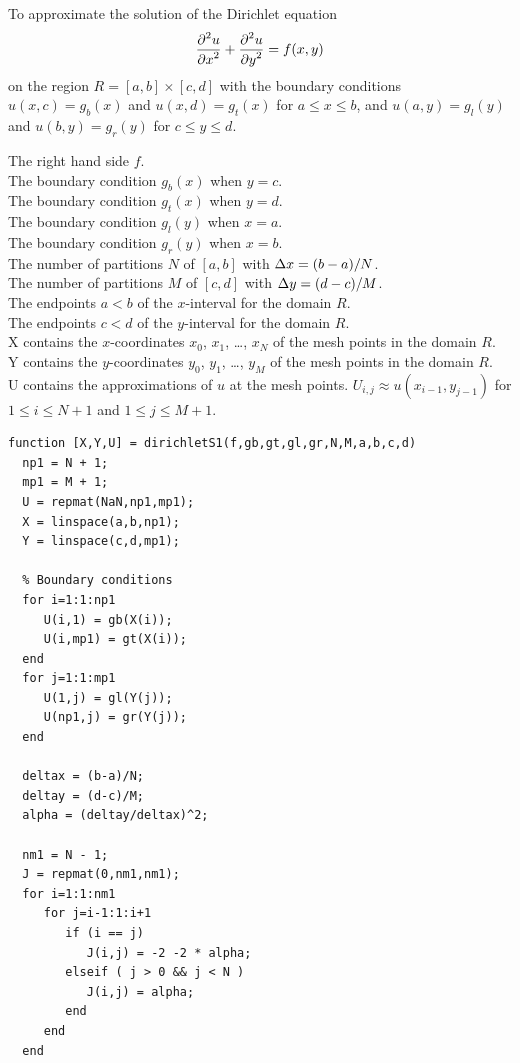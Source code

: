 \begin{code}
To approximate the solution of the Dirichlet equation
\[
  \frac{\displaystyle \partial^{2}{u}} {\displaystyle \partial{x}^{2}} + \frac{\displaystyle \partial^{2}{u}} {\displaystyle \partial{y}^{2}} = f(x,y)
\]
on the region $R = [a,b]\times[c,d]$ with the boundary conditions
$u(x,c) = g_b(x)$ and $u(x,d) = g_t(x)$ for $a \leq x \leq b$, and
$u(a,y) = g_l(y)$ and $u(b,y) = g_r(y)$ for $c \leq y \leq d$.

 The right hand side $f$.\\
The boundary condition $g_b(x)$ when $y = c$.\\
The boundary condition $g_t(x)$ when $y = d$.\\
The boundary condition $g_l(y)$ when $x = a$.\\
The boundary condition $g_r(y)$ when $x = b$.\\
The number of partitions $N$ of $[a,b]$ with $\Delta{x} = (b-a)/N$.\\
The number of partitions $M$ of $[c,d]$ with $\Delta{y} = (d-c)/M$.  \\
The endpoints $a < b$ of the $x$-interval for the domain $R$.\\
The endpoints $c < d$ of the $y$-interval for the domain $R$.\\
X contains the $x$-coordinates $x_0$, $x_1$, \ldots, $x_N$ of the
mesh points in the domain $R$.\\
Y contains the $y$-coordinates $y_0$, $y_1$, \ldots, $y_M$ of the
mesh points in the domain $R$.\\
U contains the approximations of $u$ at the mesh points.
$U_{i,j} \approx u(x_{i-1},y_{j-1})$ for $1\leq i \leq N+1$ and
$1 \leq j \leq M+1$.
\small
\begin{verbatim}
function [X,Y,U] = dirichletS1(f,gb,gt,gl,gr,N,M,a,b,c,d)
  np1 = N + 1;
  mp1 = M + 1;
  U = repmat(NaN,np1,mp1);
  X = linspace(a,b,np1);
  Y = linspace(c,d,mp1);

  % Boundary conditions
  for i=1:1:np1
     U(i,1) = gb(X(i));
     U(i,mp1) = gt(X(i));
  end
  for j=1:1:mp1
     U(1,j) = gl(Y(j));
     U(np1,j) = gr(Y(j));
  end

  deltax = (b-a)/N;
  deltay = (d-c)/M;
  alpha = (deltay/deltax)^2;

  nm1 = N - 1;
  J = repmat(0,nm1,nm1);
  for i=1:1:nm1
     for j=i-1:1:i+1
        if (i == j)
           J(i,j) = -2 -2 * alpha; 
        elseif ( j > 0 && j < N )
           J(i,j) = alpha;
        end
     end
  end


\end{verbatim}
\end{code}
